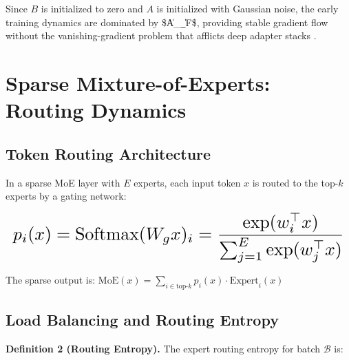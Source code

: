 \documentclass{article}
\begin{document}
Since $B$ is initialized to zero and $A$ is initialized with Gaussian noise, the early training dynamics are dominated by \$\|A\_\ell\|\_F\$, providing stable gradient flow without the vanishing-gradient problem that afflicts deep adapter stacks \cite{arxiv_2305_18290}.




\section{Sparse Mixture-of-Experts: Routing Dynamics}



\subsection{Token Routing Architecture}


In a sparse MoE layer with $E$ experts, each input token $x$ is routed to the top-$k$ experts by a gating network:















\begin{equation}
\resizebox{\columnwidth}{!}{$\displaystyle
\begin{aligned}
p_i(x) = \text{Softmax}(W_g x)_i = \frac{\exp(w_i^\top x)}{\sum_{j=1}^E \exp(w_j^\top x)}
\end{aligned}
$}
\end{equation}















The sparse output is: $\text{MoE}(x) = \sum_{i \in \text{top-}k} p_i(x) \cdot \text{Expert}_i(x)$


\subsection{Load Balancing and Routing Entropy}


\textbf{Definition 2 (Routing Entropy).} The expert routing entropy for batch $\mathcal{B}$ is:
\end{document}
